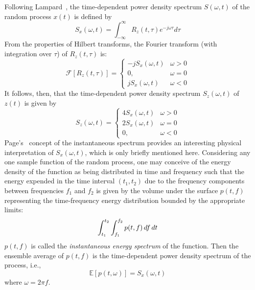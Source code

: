 \documentclass{article}
\newcommand{\tmem}[1]{{\em #1\/}}
\begin{document}
Following Lampard~{\cite{lampard1954}}, the time-dependent power density
spectrum $S (\omega, t)$ of the random process $x (t)$ is defined by
\begin{equation}
  S_x (\omega, t) = \int_{- \infty}^{\infty} R_z (t, \tau) e^{- j \omega \tau}
  d \tau \label{eq:tdspectrum}
\end{equation}
From the properties of Hilbert transforms, the Fourier transform (with
integration over $\tau$) of $R_z (t, \tau)$ is:
\begin{equation}
  \mathcal{F} [R_z (t, \tau)] = \left\{\begin{array}{ll}
    - jS_x (\omega, t) & \omega > 0\\
    0, & \omega = 0\\
    jS_x (\omega, t) & \omega < 0
  \end{array}\right. \label{eq:hilbert_fourier}
\end{equation}
It follows, then, that the time-dependent power density spectrum $S_z (\omega,
t)$ of $z (t)$ is given by
\begin{equation}
  S_z (\omega, t) = \left\{\begin{array}{ll}
    4 S_x (\omega, t) & \omega > 0\\
    2 S_x (\omega, t) & \omega = 0\\
    0, & \omega < 0
  \end{array}\right. \label{eq:preenvelope_spectrum}
\end{equation}
Page's~{\cite{page1952,kharkevich1960}} concept of the instantaneous spectrum
provides an interesting physical interpretation of $S_x (\omega, t)$, which is
only briefly mentioned here. Considering any one sample function of the random
process, one may conceive of the energy density of the function as being
distributed in time and frequency such that the energy expended in the time
interval $(t_1, t_2)$ due to the frequency components between frequencies
$f_1$ and $f_2$ is given by the volume under the surface $p (t, f)$
representing the time-frequency energy distribution bounded by the appropriate
limits:
\begin{equation}
  \int_{t_1}^{t_2} \int_{f_1}^{f_2} p (t, f)  \hspace{0.17em} df
  \hspace{0.17em} dt \label{eq:energy_density}
\end{equation}
$p (t, f)$ is called the {\tmem{instantaneous energy spectrum}} of the
function. Then the ensemble average of $p (t, f)$ is the time-dependent power
density spectrum of the process, i.e.,
\begin{equation}
  \mathbb{E} [p (t, \omega)] = S_x (\omega, t) \label{eq:ensemble_energy}
\end{equation}
where $\omega = 2 \pi f$.
\end{document}

